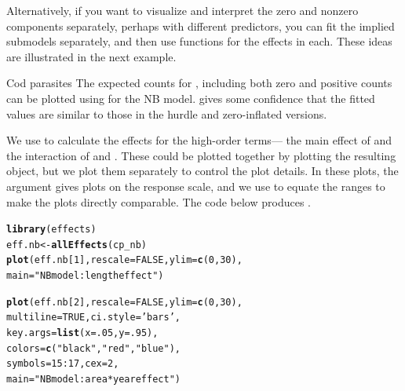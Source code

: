 \documentclass[11pt]{book}\usepackage[]{graphicx}\usepackage[]{color}
\makeatletter
\newcommand{\hlnum}[1]{\textcolor[rgb]{0.686,0.059,0.569}{#1}}%
\newcommand{\hlstr}[1]{\textcolor[rgb]{0.192,0.494,0.8}{#1}}%
\newcommand{\hlopt}[1]{\textcolor[rgb]{0,0,0}{#1}}%
\newcommand{\hlstd}[1]{\textcolor[rgb]{0.345,0.345,0.345}{#1}}%
\newcommand{\hlkwb}[1]{\textcolor[rgb]{0.69,0.353,0.396}{#1}}%
\newcommand{\hlkwc}[1]{\textcolor[rgb]{0.333,0.667,0.333}{#1}}%
\newcommand{\hlkwd}[1]{\textcolor[rgb]{0.737,0.353,0.396}{\textbf{#1}}}%
\newenvironment{kframe}{%
 \def\at@end@of@kframe{}%
 \ifinner\ifhmode%
  \def\at@end@of@kframe{\end{minipage}}%
  \begin{minipage}{\columnwidth}%
 \fi\fi%
 \def\FrameCommand##1{\hskip\@totalleftmargin \hskip-\fboxsep
 \colorbox{shadecolor}{##1}\hskip-\fboxsep
     \hskip-\linewidth \hskip-\@totalleftmargin \hskip\columnwidth}%
 \MakeFramed {\advance\hsize-\width
   \@totalleftmargin\z@ \linewidth\hsize
   \@setminipage}}%
 {\par\unskip\endMakeFramed%
 \at@end@of@kframe}
\newenvironment{knitrout}{}{} %
\renewenvironment{knitrout}{\small\renewcommand{\baselinestretch}{.85}}{} %
\makeatother
\begin{document}
Alternatively, if you want to visualize and interpret the zero and nonzero components
separately, perhaps with different predictors, you can fit the implied submodels
separately, and then use  functions for the effects in each.
These ideas are illustrated in the next example.

\begin{Example}[cod3]{Cod parasites}
The expected counts for , including both zero and positive counts
can be plotted using  for the  NB model.
 gives some confidence that the fitted values
are similar to those in the hurdle and zero-inflated versions.

We use  to calculate the effects for the high-order terms--- the
main effect of  and the interaction of  and .
These could be plotted together by plotting the resulting  object,
but we plot them separately to control the plot details.  In these plots,
the argument  gives plots on the response scale, and
we use  to equate the ranges to make the plots directly comparable.
The code below produces .

\begin{knitrout}
\color{fgcolor}\begin{kframe}
\begin{alltt}
\hlkwd{library}\hlstd{(effects)}
\hlstd{eff.nb} \hlkwb{<-} \hlkwd{allEffects}\hlstd{(cp_nb)}
\hlkwd{plot}\hlstd{(eff.nb[}\hlnum{1}\hlstd{],} \hlkwc{rescale}\hlstd{=}\hlnum{FALSE}\hlstd{,} \hlkwc{ylim}\hlstd{=}\hlkwd{c}\hlstd{(}\hlnum{0}\hlstd{,}\hlnum{30}\hlstd{),}
     \hlkwc{main}\hlstd{=}\hlstr{"NB model: length effect"}\hlstd{)}

\hlkwd{plot}\hlstd{(eff.nb[}\hlnum{2}\hlstd{],} \hlkwc{rescale}\hlstd{=}\hlnum{FALSE}\hlstd{,} \hlkwc{ylim}\hlstd{=}\hlkwd{c}\hlstd{(}\hlnum{0}\hlstd{,}\hlnum{30}\hlstd{),}
     \hlkwc{multiline}\hlstd{=}\hlnum{TRUE}\hlstd{,} \hlkwc{ci.style}\hlstd{=}\hlstr{'bars'}\hlstd{,}
     \hlkwc{key.args}\hlstd{=}\hlkwd{list}\hlstd{(}\hlkwc{x}\hlstd{=}\hlnum{.05}\hlstd{,} \hlkwc{y}\hlstd{=}\hlnum{.95}\hlstd{),}
     \hlkwc{colors}\hlstd{=}\hlkwd{c}\hlstd{(}\hlstr{"black"}\hlstd{,} \hlstr{"red"}\hlstd{,} \hlstr{"blue"}\hlstd{) ,}
     \hlkwc{symbols}\hlstd{=}\hlnum{15}\hlopt{:}\hlnum{17}\hlstd{,} \hlkwc{cex}\hlstd{=}\hlnum{2}\hlstd{,}
     \hlkwc{main}\hlstd{=}\hlstr{"NB model: area*year effect"}\hlstd{)}
\end{alltt}
\end{kframe}\begin{figure}[!htbp]


\end{figure}
\end{knitrout}
\end{Example}
\end{document}
